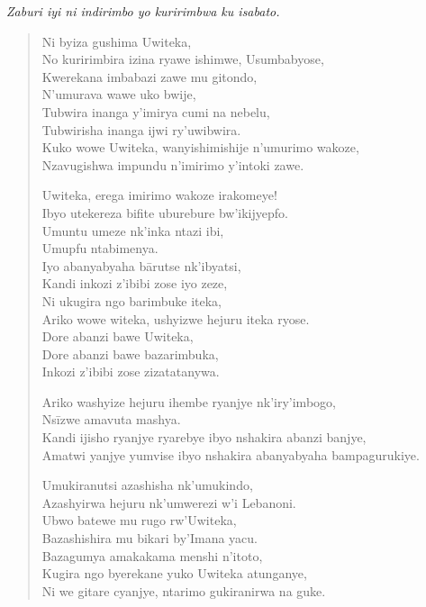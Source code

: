 \documentclass{article}
\begin{document}
\begin{paracol}{2}
    \begin{column}

        \emph{Zaburi iyi ni indirimbo yo kuririmbwa ku isabato.}

        \begin{verse}
            Ni byiza gushima Uwiteka, \\
            No kuririmbira izina ryawe ishimwe, Usumbabyose, \\
            Kwerekana imbabazi zawe mu gitondo, \\
            N'umurava wawe uko bwije, \\
            Tubwira inanga y'imirya cumi na nebelu, \\
            Tubwirisha inanga ijwi ry'uwibwira. \\
            Kuko wowe Uwiteka, wanyishimishije n'umurimo wakoze, \\
            Nzavugishwa impundu n'imirimo y'intoki zawe.
            
            Uwiteka, erega imirimo wakoze irakomeye! \\
            Ibyo utekereza bifite uburebure bw'ikijyepfo. \\
            Umuntu umeze nk'inka ntazi ibi, \\
            Umupfu ntabimenya. \\
            Iyo abanyabyaha bārutse nk'ibyatsi, \\
            Kandi inkozi z'ibibi zose iyo zeze, \\
            Ni ukugira ngo barimbuke iteka, \\
            Ariko wowe witeka, ushyizwe hejuru iteka ryose. \\
            Dore abanzi bawe Uwiteka, \\
            Dore abanzi bawe bazarimbuka, \\
            Inkozi z'ibibi zose zizatatanywa.
        
            Ariko washyize hejuru ihembe ryanjye nk'iry'imbogo, \\
            Nsīzwe amavuta mashya. \\
            Kandi ijisho ryanjye ryarebye ibyo nshakira abanzi banjye, \\
            Amatwi yanjye yumvise ibyo nshakira abanyabyaha bampagurukiye.

            Umukiranutsi azashisha nk'umukindo, \\
            Azashyirwa hejuru nk'umwerezi w'i Lebanoni. \\
            Ubwo batewe mu rugo rw'Uwiteka, \\
            Bazashishira mu bikari by'Imana yacu. \\
            Bazagumya amakakama menshi n'itoto, \\
            Kugira ngo byerekane yuko Uwiteka atunganye, \\
            Ni we gitare cyanjye, ntarimo gukiranirwa na guke.
        \end{verse}


\end{column}
\end{paracol}
\end{document}
